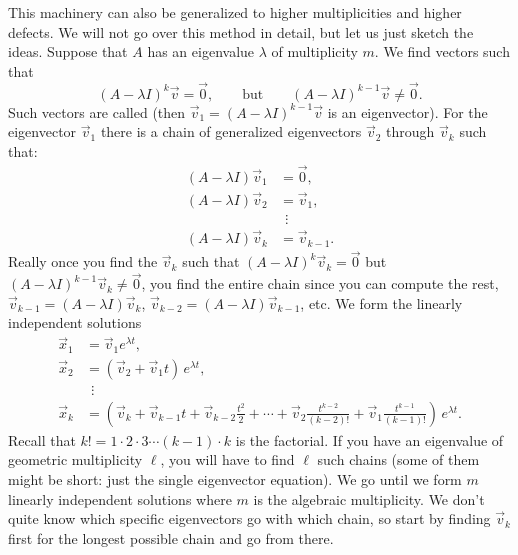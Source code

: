 This machinery can also be generalized to higher multiplicities
and higher defects.
We will not go over this method in detail, but let us just sketch the ideas.  Suppose that $A$
has an eigenvalue $\lambda$ of multiplicity $m$.
We find vectors such that
\begin{equation*}
{(A - \lambda I)}^k \vec{v} = \vec{0},
\qquad \text{but} \qquad
{(A - \lambda I)}^{k-1} \vec{v} \not= \vec{0}.
\end{equation*}
Such vectors are called \emph{} (then
$\vec{v}_1 = {(A - \lambda I)}^{k-1} \vec{v}$ is an eigenvector).
For the
eigenvector $\vec{v}_1$ there is a chain of generalized eigenvectors
$\vec{v}_2$ through $\vec{v}_k$ such that:
\begin{align*}
(A - \lambda I) \vec{v}_1 & = \vec{0} , \\
(A - \lambda I) \vec{v}_2 & = \vec{v}_1 , \\
& ~~\vdots \\
(A - \lambda I) \vec{v}_k & = \vec{v}_{k-1} .
\end{align*}
Really once you find the $\vec{v}_k$ such that
${(A - \lambda I)}^k \vec{v}_k = \vec{0}$ but
${(A - \lambda I)}^{k-1} \vec{v}_k \not= \vec{0}$, you find the entire
chain since you can compute the rest,
$\vec{v}_{k-1} = (A - \lambda I) \vec{v}_k$,
$\vec{v}_{k-2} = (A - \lambda I) \vec{v}_{k-1}$, etc.
We form the linearly independent solutions
\begin{align*}
\vec{x}_1 & = \vec{v}_1 e^{\lambda t} , \\
\vec{x}_2 & = ( \vec{v}_2 + \vec{v}_1 t ) \, e^{\lambda t} , \\
& ~~\vdots \\
\vec{x}_k & = \left( \vec{v}_k + \vec{v}_{k-1} t +
\vec{v}_{k-2} \frac{t^2}{2} +
\cdots + \vec{v}_2 \frac{t^{k-2}}{(k-2)!} + \vec{v}_1 \frac{t^{k-1}}{(k-1)!}
\right) \, e^{\lambda t} .
\end{align*}
Recall that $k! = 1 \cdot 2 \cdot 3 \cdots (k-1) \cdot k$ is the factorial.
If you have an eigenvalue of geometric multiplicity $\ell$,
you will have to find $\ell$ such chains (some of them might be
short: just the single eigenvector equation).
We go until we form $m$ linearly independent solutions where
$m$ is the algebraic multiplicity.
We don't quite know which specific eigenvectors go with which chain, so
start by finding $\vec{v}_k$ first for the longest possible chain and
go from there.


